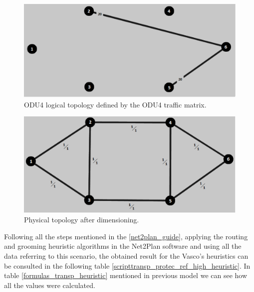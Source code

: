 \begin{figure}[H]
\centering
\includegraphics[width=13cm]{sdf/heuristic/transparent_protection/figures/logical_topology_odu4_high}
\caption{ODU4 logical topology defined by the ODU4 traffic matrix.}
\label{logical_ODU4_protection_ref_high_heuristic_transparent}
\end{figure}

\begin{figure}[H]
\centering
\includegraphics[width=13cm]{sdf/heuristic/transparent_protection/figures/physical_topology}
\caption{Physical topology after dimensioning.}
\label{physical_topology_protection_ref_high_heuristic_transparent}
\end{figure}

Following all the steps mentioned in the \ref{net2plan_guide}, applying the routing and grooming heuristic algorithms in the Net2Plan software and using all the data referring to this scenario, the obtained result for the Vasco's heuristics can be consulted in the following table \ref{scripttransp_protec_ref_high_heuristic}. In table \ref{formulas_transp_heuristic} mentioned in previous model we can see how all the values were calculated. \\

